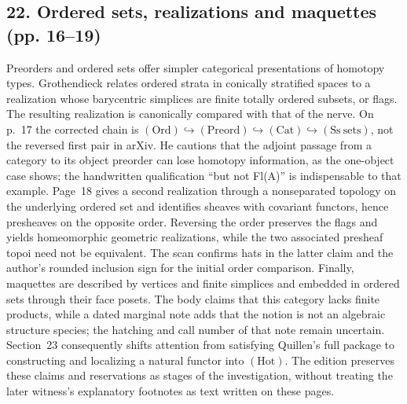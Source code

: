 \subsection*{22. Ordered sets, realizations and maquettes (pp. 16--19)}
Preorders and ordered sets offer simpler categorical presentations of homotopy types. Grothendieck relates ordered strata in conically stratified spaces to a realization whose barycentric simplices are finite totally ordered subsets, or flags. The resulting realization is canonically compared with that of the nerve. On p.~17 the corrected chain is $(\mathrm{Ord})\hookrightarrow(\mathrm{Preord})\hookrightarrow(\mathrm{Cat})\hookrightarrow(\mathrm{Ss\ sets})$, not the reversed first pair in arXiv. He cautions that the adjoint passage from a category to its object preorder can lose homotopy information, as the one-object case shows; the handwritten qualification ``but not Fl(A)'' is indispensable to that example. Page~18 gives a second realization through a nonseparated topology on the underlying ordered set and identifies sheaves with covariant functors, hence presheaves on the opposite order. Reversing the order preserves the flags and yields homeomorphic geometric realizations, while the two associated presheaf topoi need not be equivalent. The scan confirms hats in the latter claim and the author's rounded inclusion sign for the initial order comparison. Finally, maquettes are described by vertices and finite simplices and embedded in ordered sets through their face posets. The body claims that this category lacks finite products, while a dated marginal note adds that the notion is not an algebraic structure species; the hatching and call number of that note remain uncertain. Section~23 consequently shifts attention from satisfying Quillen's full package to constructing and localizing a natural functor into $(\mathrm{Hot})$. The edition preserves these claims and reservations as stages of the investigation, without treating the later witness's explanatory footnotes as text written on these pages.

